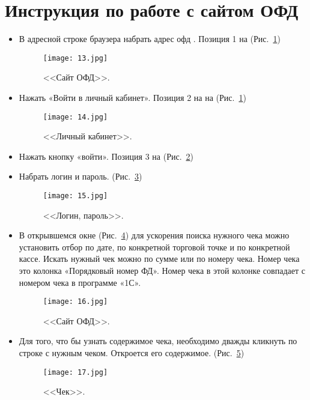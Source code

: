 \section{Инструкция по работе с сайтом ОФД} \label{5500}
\begin{itemize}	
	\item В адресной строке браузера набрать адрес офд . Позиция 1 на (Рис.~\ref{ris:13.jpg})
	
	
	\begin{figure}[H]
		\texttt{[image: 13.jpg]}
		\caption{<<Сайт ОФД>>.}
		\label{ris:13.jpg}
	\end{figure}

	\item Нажать «Войти в личный кабинет». Позиция 2 на на (Рис.~\ref{ris:13.jpg})


	\begin{figure}[H]
		\texttt{[image: 14.jpg]}
		\caption{<<Личный кабинет>>.}
		\label{ris:14.jpg}
	\end{figure}
	
	
	\item Нажать кнопку «войти». Позиция 3 на (Рис.~\ref{ris:14.jpg})
	
	\item Набрать логин и пароль. (Рис.~\ref{ris:15.jpg})
	
	\begin{figure}[H]
		\texttt{[image: 15.jpg]}
		\caption{<<Логин, пароль>>.}
		\label{ris:15.jpg}
	\end{figure}
	
	
	
	\item В открывшемся окне (Рис.~\ref{ris:16.jpg}) для ускорения поиска нужного чека можно установить отбор по дате, по конкретной торговой точке и по конкретной кассе. Искать нужный чек можно по сумме или по номеру чека. Номер чека это колонка «Порядковый номер ФД». Номер чека в этой колонке совпадает с номером чека в программе «1С».
	
	\begin{figure}[H]
		\texttt{[image: 16.jpg]}
		\caption{<<Сайт ОФД>>.}
		\label{ris:16.jpg}
	\end{figure}

	\item Для того, что бы узнать содержимое чека, необходимо дважды кликнуть по строке с нужным чеком. Откроется его содержимое. (Рис.~\ref{ris:17.jpg})
	

	\begin{figure}[H]
		\texttt{[image: 17.jpg]}
		\caption{<<Чек>>.}
		\label{ris:17.jpg}
	\end{figure}
	
	
	
\end{itemize}
